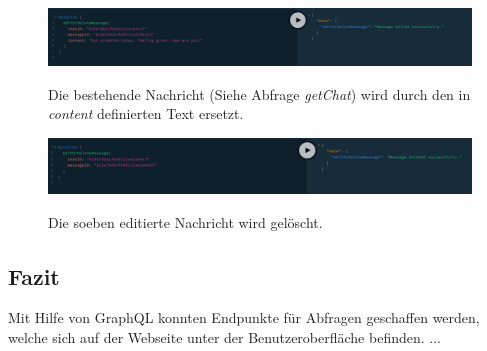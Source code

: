 \begin{figure}
	\centering
    \includegraphics[width=\textwidth]{sources/graphiql_editMessage.png}\cite{}
	\caption{Die bestehende Nachricht (Siehe Abfrage \textit{getChat}) wird durch den in \textit{content} definierten Text ersetzt.}
	\label{figGQL8}
\end{figure}

\begin{figure}
	\centering
    \includegraphics[width=\textwidth]{sources/graphiql_deleteMessage.png}\cite{}
	\caption{Die soeben editierte Nachricht wird gelöscht.}
	\label{figGQL9}
\end{figure}

\subsection{Fazit}
Mit Hilfe von GraphQL konnten Endpunkte für Abfragen geschaffen werden, welche sich auf der Webseite unter der Benutzeroberfläche befinden. ...